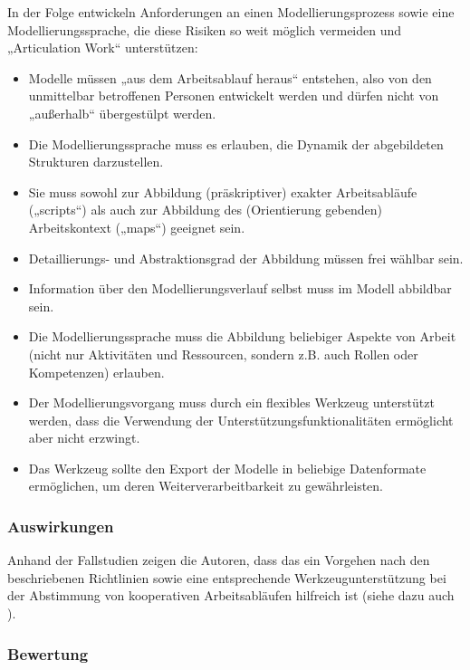 \label{steps:herrmann} In der Folge entwickeln \citeauthor{Herrmann02} Anforderungen an einen Modellierungsprozess sowie eine Modellierungssprache, die diese Risiken so weit möglich vermeiden und „Articulation Work“ unterstützen:
\begin{itemize}
	\item Modelle müssen „aus dem Arbeitsablauf heraus“ entstehen, also von den unmittelbar betroffenen Personen entwickelt werden und dürfen nicht von „außerhalb“ übergestülpt werden.
	\item Die Modellierungssprache muss es erlauben, die Dynamik der abgebildeten Strukturen darzustellen.
	\item Sie muss sowohl zur Abbildung (präskriptiver) exakter Arbeitsabläufe („scripts“) als auch zur Abbildung des (Orientierung gebenden) Arbeitskontext („maps“) geeignet sein.
	\item Detaillierungs- und Abstraktionsgrad der Abbildung müssen frei wählbar sein.
	\item Information über den Modellierungsverlauf selbst muss im Modell abbildbar sein.
	\item Die Modellierungssprache muss die Abbildung beliebiger Aspekte von Arbeit (nicht nur Aktivitäten und Ressourcen, sondern z.B. auch Rollen oder Kompetenzen) erlauben.
	\item Der Modellierungsvorgang muss durch ein flexibles Werkzeug unterstützt werden, dass die Verwendung der Unterstützungsfunktionalitäten ermöglicht aber nicht erzwingt.
	\item Das Werkzeug sollte den Export der Modelle in beliebige Datenformate ermöglichen, um deren Weiterverarbeitbarkeit zu gewährleisten.
\end{itemize}

\subsubsection{Auswirkungen}

Anhand der Fallstudien zeigen die Autoren, dass das ein Vorgehen nach den beschriebenen Richtlinien sowie eine entsprechende Werkzeugunterstützung bei der Abstimmung von kooperativen Arbeitsabläufen hilfreich ist (siehe dazu auch \citep{Herrmann00}).

\subsubsection{Bewertung}


